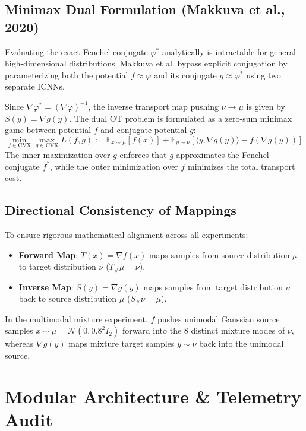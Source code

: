 \documentclass[11pt,a4paper]{article}
\begin{document}
\subsection{Minimax Dual Formulation (Makkuva et al., 2020)}
Evaluating the exact Fenchel conjugate $\varphi^*$ analytically is intractable for general high-dimensional distributions. Makkuva et al. bypass explicit conjugation by parameterizing both the potential $f \approx \varphi$ and its conjugate $g \approx \varphi^*$ using two separate ICNNs.

Since $\nabla \varphi^* = (\nabla \varphi)^{-1}$, the inverse transport map pushing $\nu \to \mu$ is given by $S(y) = \nabla g(y)$. The dual OT problem is formulated as a zero-sum minimax game between potential $f$ and conjugate potential $g$:
\begin{equation}
\min_{f \in \text{CVX}} \max_{g \in \text{CVX}} L(f, g) := \mathbb{E}_{x \sim \mu}[f(x)] + \mathbb{E}_{y \sim \nu} \left[ \langle y, \nabla g(y) \rangle - f(\nabla g(y)) \right]
\end{equation}
The inner maximization over $g$ enforces that $g$ approximates the Fenchel conjugate $f^*$, while the outer minimization over $f$ minimizes the total transport cost.

\subsection{Directional Consistency of Mappings}
To ensure rigorous mathematical alignment across all experiments:
\begin{itemize}
    \item \textbf{Forward Map}: $T(x) = \nabla f(x)$ maps samples from source distribution $\mu$ to target distribution $\nu$ ($T_\# \mu = \nu$).
    \item \textbf{Inverse Map}: $S(y) = \nabla g(y)$ maps samples from target distribution $\nu$ back to source distribution $\mu$ ($S_\# \nu = \mu$).
\end{itemize}
In the multimodal mixture experiment, $f$ pushes unimodal Gaussian source samples $x \sim \mu = \mathcal{N}(0, 0.8^2 I_2)$ forward into the 8 distinct mixture modes of $\nu$, whereas $\nabla g(y)$ maps mixture target samples $y \sim \nu$ back into the unimodal source.

\section{Modular Architecture \& Telemetry Audit}
\end{document}
